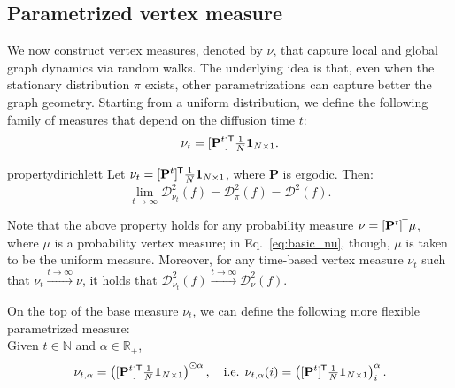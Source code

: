\documentclass[10pt]{article} %
\def\rmP{{\mathbf{P}}}
\newcommand{\D}[2]{\mathcal{D}^2_{#1}(#2)}
\renewcommand*{\top}{{\mkern-1.4mu\mathsf{T}}}
\newcommand{\one}   		{\boldsymbol{1}}
\begin{document}
\subsection{Parametrized vertex measure} \label{sec:parametrized-vertex-measure}

We now construct vertex measures, denoted by $\nu$, that capture local and global graph dynamics via random walks. The underlying idea is that, even when the stationary distribution $\pi$ exists, other parametrizations can capture better the graph geometry.
%
Starting from a uniform distribution, we define the following family of measures that depend on the diffusion time $t$:
\begin{equation} \label{eq:basic_nu}
  \nu_t = [\rmP^t]^\top \tfrac{1}{N} \one_{N \times 1}.
\end{equation}
%

\begin{restatable}[]{property}{dirichlett}
\label{prop:dirichlet_t}
Let $\nu_t = [\rmP^t]^\top \tfrac{1}{N} \one_{N \times 1}$, where $\rmP$ is ergodic. Then:
\begin{equation}
  \lim_{t \to \infty} \D{\nu_t}{f} = \D{\pi}{f} = \D{}{f}.
\end{equation}
\end{restatable}
Note that the above property holds for any probability measure $\nu = [\rmP^t]^\top \mu$, where $\mu$ is a probability vertex measure; in Eq.~\ref{eq:basic_nu}, though, $\mu$ is taken to be the uniform measure. Moreover, for any time-based vertex measure $\nu_t$ such that $\nu_t \xrightarrow{t \to \infty} \nu$, it holds that $\D{\nu_t}{f} \xrightarrow{t \to \infty} \D{\nu}{f}$.

On the top of the base measure $\nu_t$, we can define the following more flexible parametrized measure: \\
Given $t \in \mathbb{N}$ and $\alpha \in \mathbb{R}_+$,
\begin{equation}\label{eq:refined_nu}
  \nu_{t,\alpha} = \left( [\rmP^t]^\top \tfrac{1}{N} \one_{N \times 1} \right)^{\odot \alpha}, \quad \text{i.e. } \nu_{t,\alpha}(i) = \left( [\rmP^t]^\top \tfrac{1}{N} \one_{N \times 1} \right)_i^\alpha.
\end{equation}
\end{document}
